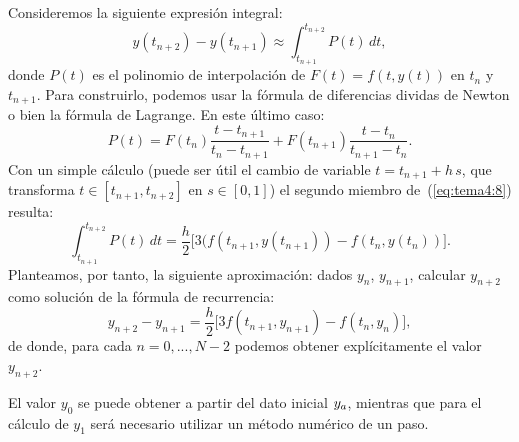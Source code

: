\begin{example}
  \label{sec:AB-dos-pasos}
  Consideremos la siguiente expresión integral:
  \begin{equation}
   \label{eq:tema4:8} 
   y(t_{n+2})-y(t_{n+1}) \approx \int_{t_{n+1}}^{t_{n+2}} P(t)\,dt,
  \end{equation}
  donde $P(t)$ es el polinomio de interpolación de $F(t)=f(t,y(t))$ en
  $t_n$ y $t_{n+1}$. Para construirlo, podemos usar la fórmula de
  diferencias dividas de Newton o bien la fórmula de Lagrange. En este
  último caso:
  \begin{equation*}
   P(t)=F(t_n)\frac{t-t_{n+1}}{t_n-t_{n+1}} +
   F(t_{n+1})\frac{t-t_{n}}{t_{n+1}-t_{n}}.
  \end{equation*}
  Con un simple cálculo (puede ser útil el cambio de variable $t =
  t_{n+1}+h\,s$, que transforma $t\in [t_{n+1},t_{n+2}]$ en $s\in [0,1]$)
  el segundo miembro de~(\ref{eq:tema4:8}) resulta:
  \begin{equation*}
  \int_{t_{n+1}}^{t_{n+2}} P(t)\,dt = \frac{h}{2} \big[
  3(f(t_{n+1},y(t_{n+1})) - f(t_{n},y(t_{n})) \big].
  \end{equation*}
  Planteamos, por tanto, la siguiente aproximación: dados $y_n$,
  $y_{n+1}$, calcular $y_{n+2}$ como solución de la
  fórmula de recurrencia:
  \begin{equation*}
    y_{n+2}-y_{n+1} = \frac{h}{2} \big[
  3f(t_{n+1},y_{n+1}) - f(t_{n},y_{n}) \big],
  \end{equation*} de donde, para cada $n=0,...,N-2$ podemos obtener explícitamente el
  valor $y_{n+2}$.
  
  El valor $y_0$ se puede obtener a partir del dato inicial ${y_a}$,
  mientras que para el cálculo de $y_1$ será necesario utilizar un
  método numérico de un paso.
\end{example}
